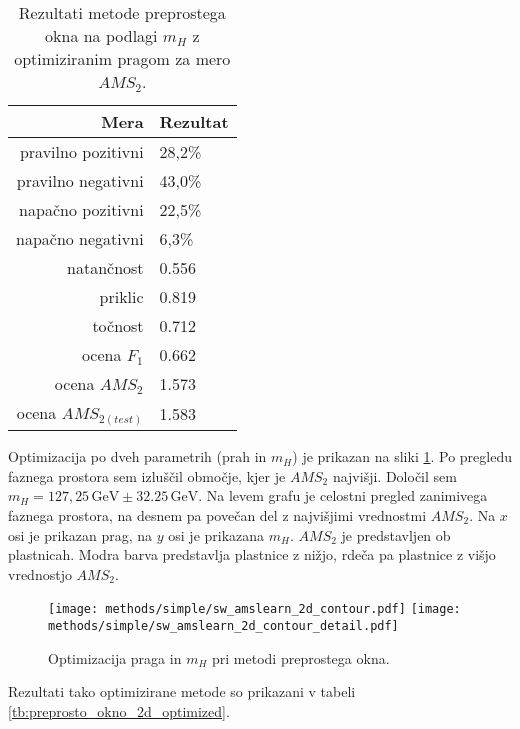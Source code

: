 \documentclass[11pt,a4paper,openany]{book}
\begin{document}
\begin{table}[ht]
	\centering
	\begin{tabular}{rl}
		\hline
		\textbf{Mera} & \textbf{Rezultat} \\
		\hline
		pravilno pozitivni & 28,2\%\\
		pravilno negativni & 43,0\% \\
		napačno pozitivni & 22,5\% \\
		napačno negativni & 6,3\% \\
		natančnost & 0.556 \\
		priklic & 0.819 \\
		točnost & 0.712 \\
		ocena $F_1$ & 0.662 \\
		ocena $AMS_2$ & 1.573 \\
		ocena $AMS_{2(test)}$ & 1.583 		
	\end{tabular}
	\caption{Rezultati metode preprostega okna na podlagi $m_H$ z optimiziranim pragom za mero $AMS_2$.}
	\label{tb:preprosto_okno_optimized}
\end{table}

Optimizacija po dveh parametrih (prah in $m_H$) je prikazan na sliki \ref{sl:simple_optimization_2d}. Po pregledu faznega prostora sem izluščil območje, kjer je $AMS_2$ najvišji. Določil sem $m_H = 127,25\,\text{GeV} \pm 32.25\,\text{GeV}$. Na levem grafu je celostni pregled zanimivega faznega prostora, na desnem pa povečan del z najvišjimi vrednostmi $AMS_2$. Na $x$ osi je prikazan prag, na $y$ osi je prikazana $m_H$. $AMS_2$ je predstavljen ob plastnicah. Modra barva predstavlja plastnice z nižjo, rdeča pa plastnice z višjo vrednostjo $AMS_2$.

\begin{figure}[h]
	\centering	
	\texttt{[image: methods/simple/sw\_amslearn\_2d\_contour.pdf]}
	\texttt{[image: methods/simple/sw\_amslearn\_2d\_contour\_detail.pdf]}		
	
	\caption{Optimizacija praga in $m_H$ pri metodi preprostega okna.}
	\label{sl:simple_optimization_2d}
\end{figure}

Rezultati tako optimizirane metode so prikazani v tabeli \ref{tb:preprosto_okno_2d_optimized}.
\end{document}
